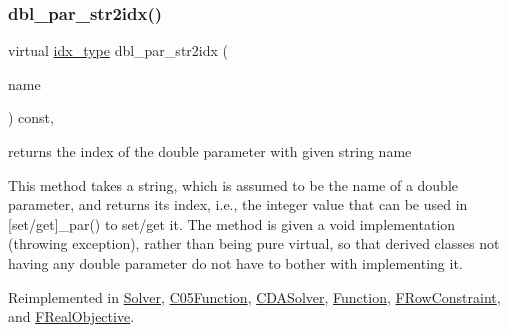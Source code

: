 \mbox{\label{class_s_m_spp__di__unipi__it_1_1_thin_compute_interface_a82f363814aa27e3243ba994a1ed5f39e}} 
\subsubsection{\texorpdfstring{dbl\+\_\+par\+\_\+str2idx()}{dbl\_par\_str2idx()}}
{\footnotesize\ttfamily virtual \mbox{\hyperlink{class_s_m_spp__di__unipi__it_1_1_thin_compute_interface_aa3d710629ad8c434286726ad810c3b47}{idx\+\_\+type}} dbl\+\_\+par\+\_\+str2idx (\begin{DoxyParamCaption}\item[{const std\+::string \&}]{name }\end{DoxyParamCaption}) const\hspace{0.3cm}{\ttfamily [inline]}, {\ttfamily [virtual]}}



returns the index of the double parameter with given string name 

This method takes a string, which is assumed to be the name of a double parameter, and returns its index, i.\+e., the integer value that can be used in \mbox{[}set/get\mbox{]}\+\_\+par() to set/get it. The method is given a void implementation (throwing exception), rather than being pure virtual, so that derived classes not having any double parameter do not have to bother with implementing it. 

Reimplemented in \mbox{\hyperlink{class_s_m_spp__di__unipi__it_1_1_solver_a6d353ac3d1200d9bea89235da61bc4f3}{Solver}}, \mbox{\hyperlink{class_s_m_spp__di__unipi__it_1_1_c05_function_a6d353ac3d1200d9bea89235da61bc4f3}{C05\+Function}}, \mbox{\hyperlink{class_s_m_spp__di__unipi__it_1_1_c_d_a_solver_a6d353ac3d1200d9bea89235da61bc4f3}{C\+D\+A\+Solver}}, \mbox{\hyperlink{class_s_m_spp__di__unipi__it_1_1_function_a6d353ac3d1200d9bea89235da61bc4f3}{Function}}, \mbox{\hyperlink{class_s_m_spp__di__unipi__it_1_1_f_row_constraint_a6d353ac3d1200d9bea89235da61bc4f3}{F\+Row\+Constraint}}, and \mbox{\hyperlink{class_s_m_spp__di__unipi__it_1_1_f_real_objective_a6d353ac3d1200d9bea89235da61bc4f3}{F\+Real\+Objective}}.

